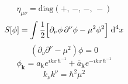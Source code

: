 \begin{equation}
	\eta_{\mu\nu}=\text{diag}\left(+,\,-,\,-,\,-\right)
\end{equation}
\begin{equation}
	S[\phi]=\int\frac{1}{2}\Big[\partial_\nu\phi\,\partial^\nu\phi-\mu^2\phi^2\Big]\;\text{d}^4 x
\end{equation}
\begin{equation}
	\left(\partial_\nu\partial^\nu-\mu^2\right)\phi=0
\end{equation}
\begin{equation}
	\phi_\mathbf{k}=a_\mathbf{k}e^{ikx\,\hbar^{-1}}+\bar a_\mathbf{k}e^{-ikx\,\hbar^{-1}}
\end{equation}
\begin{equation}
	k_\nu k^\nu=\hbar^2\mu^2
\end{equation}